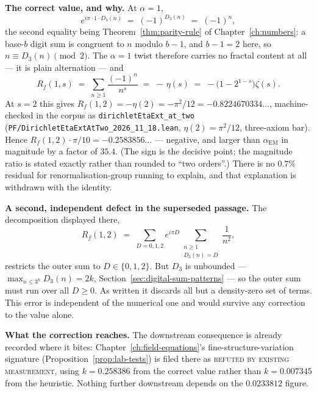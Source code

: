 \medskip
\noindent\textbf{The correct value, and why.} At $\alpha = 1$,
\begin{equation}
e^{i\pi \cdot 1 \cdot D_3(n)} \;=\; (-1)^{D_3(n)} \;=\; (-1)^{n},
\end{equation}
the second equality being Theorem~\ref{thm:parity-rule} of
Chapter~\ref{ch:numbers}: a base-$b$ digit sum is congruent to $n$ modulo
$b-1$, and $b-1 = 2$ here, so $n \equiv D_3(n) \pmod 2$. The $\alpha = 1$
twist therefore carries no fractal content at all --- it is plain
alternation --- and
\begin{equation}
R_f(1, s) \;=\; \sum_{n \geq 1} \frac{(-1)^{n}}{n^{s}}
          \;=\; -\,\eta(s) \;=\; -\bigl(1 - 2^{1-s}\bigr)\zeta(s).
\end{equation}
At $s = 2$ this gives $R_f(1,2) = -\eta(2) = -\pi^2/12 = -0.8224670334\ldots$,
machine-checked in the corpus as
\texttt{dirichletEtaExt\_at\_two} (\texttt{PF/DirichletEtaExtAtTwo\_2026\_11\_18.lean},
$\eta(2) = \pi^2/12$, three-axiom bar). Hence
$R_f(1,2)\cdot\pi/10 = -0.2583856\ldots$ --- negative, and larger than
$\alpha_{\text{EM}}$ in magnitude by a factor of $35.4$. (The sign is the
decisive point; the magnitude ratio is stated exactly rather than rounded to
``two orders''.) There is no $0.7\%$ residual for
renormalisation-group running to explain, and that explanation is withdrawn
with the identity.

\medskip
\noindent\textbf{A second, independent defect in the superseded passage.}
The decomposition displayed there,
\begin{equation*}
R_f(1,2) \;=\; \sum_{D = 0,1,2} e^{i\pi D}
               \sum_{\substack{n \geq 1 \\ D_3(n) = D}} \frac{1}{n^{2}},
\end{equation*}
restricts the outer sum to $D \in \{0,1,2\}$. But $D_3$ is unbounded ---
$\max_{n \leq 3^{k}} D_3(n) = 2k$, Section~\ref{sec:digital-sum-patterns} ---
so the outer sum must run over all $D \geq 0$. As written it discards all but
a density-zero set of terms. This error is independent of the numerical one
and would survive any correction to the value alone.

\medskip
\noindent\textbf{What the correction reaches.} The downstream consequence is
already recorded where it bites: Chapter~\ref{ch:field-equations}'s
fine-structure-variation signature (Proposition~\ref{prop:lab-tests}) is
filed there as \textsc{refuted by existing measurement}, using
$k = 0.258386$ from the correct value rather than $k = 0.007345$ from the
heuristic. Nothing further downstream depends on the $0.0233812$ figure.

